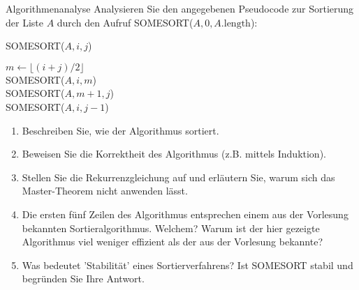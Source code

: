 \documentclass{article}
\begin{document}
\begin{exercise}{Algorithmenanalyse}
  Analysieren Sie den angegebenen Pseudocode zur Sortierung der Liste $A$ durch den Aufruf SOMESORT($A, 0, A.\text{length}$):
  \begin{algorithm}[ht]
    \caption{SOMESORT($A, i, j$)}
    $m \gets \lfloor (i+j)/2 \rfloor$ \\
    SOMESORT($A, i, m$) \\
    SOMESORT($A, m+1, j$) \\
    SOMESORT($A, i, j-1$)
  \end{algorithm}
  \begin{enumerate}
    \item Beschreiben Sie, wie der Algorithmus sortiert.
    \item Beweisen Sie die Korrektheit des Algorithmus (z.B. mittels Induktion).
    \item Stellen Sie die Rekurrenzgleichung auf und erläutern Sie, warum sich das Master-Theorem nicht anwenden lässt.
    \item Die ersten fünf Zeilen des Algorithmus entsprechen einem aus der Vorlesung bekannten Sortieralgorithmus. Welchem? Warum ist der hier gezeigte Algorithmus viel weniger effizient als der aus der Vorlesung bekannte?
    \item Was bedeutet 'Stabilität' eines Sortierverfahrens? Ist SOMESORT stabil und begründen Sie Ihre Antwort.
  \end{enumerate}
\end{exercise}
\end{document}
